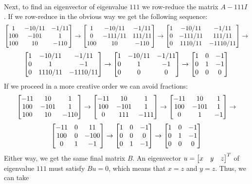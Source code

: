 \documentclass[a4paper]{amsart}
\renewenvironment{solution}{\SolutionInline}{\endSolutionInline}
\begin{document}
\begin{solution}
 Next, to find an eigenvector of eigenvalue $111$ we row-reduce the
 matrix $A-111I$.  If we row-reduce in the obvious way we get the
 following sequence:
 \[
  \left[\begin{matrix}
  1&-10/11&-1/11\\
  100&-101&1\\
  100&10&-110\\
  \end{matrix}\right]
  \to
  \left[\begin{matrix}
  1&-10/11&-1/11\\
  0&-111/11&111/11\\
  100&10&-110\\
  \end{matrix}\right]
  \to
  \left[\begin{matrix}
  1&-10/11&-1/11\\
  0&-111/11&111/11\\
  0&1110/11&-1110/11\\
  \end{matrix}\right]
  \to
  \] \[
  \left[\begin{matrix}
  1&-10/11&-1/11\\
  0&1&-1\\
  0&1110/11&-1110/11\\
  \end{matrix}\right]
  \to
  \left[\begin{matrix}
  1&-10/11&-1/11\\
  0&1&-1\\
  0&0&0\\
  \end{matrix}\right]
  \to
  \left[\begin{matrix}
  1&0&-1\\
  0&1&-1\\
  0&0&0\\
  \end{matrix}\right]
 \]
 If we proceed in a more creative order we can avoid fractions:
 \[ \left[\begin{matrix}
     -11 &   10 & 1 \\
     100 & -101 & 1 \\
     100 &   10 & -110
    \end{matrix}\right] 
    \to
    \left[\begin{matrix}
     -11 &   10 & 1 \\
     100 & -101 & 1 \\
       0 &  111 & -111
    \end{matrix}\right] 
    \to
    \left[\begin{matrix}
     -11 &   10 & 1 \\
     100 & -101 & 1 \\
       0 &    1 & -1
    \end{matrix}\right] 
    \to
  \] \[
    \left[\begin{matrix}
     -11 &    0 & 11 \\
     100 &    0 & -100 \\
       0 &    1 & -1
    \end{matrix}\right] 
    \to
    \left[\begin{matrix}
       1 &    0 & -1 \\
       0 &    0 &  0 \\
       0 &    1 & -1
    \end{matrix}\right] 
    \to
    \left[\begin{matrix}
       1 &    0 & -1 \\
       0 &    1 & -1 \\
       0 &    0 &  0 
    \end{matrix}\right] 
 \]
 Either way, we get the same final matrix $B$.  An eigenvector
 $u=\left[\begin{matrix} x&y&z\end{matrix}\right]^T$ of eigenvalue $111$ must satisfy $Bu=0$, which
 means that $x=z$ and $y=z$.  Thus, we can take

\end{solution}
\end{document}
